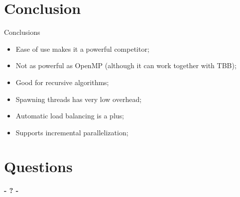 \documentclass{beamer}
\begin{document}
\section{Conclusion}
\begin{frame}[fragile]
	\begin{block}{Conclusions}
		\begin{itemize}
			\item Ease of use makes it a powerful competitor;			
			\item Not as powerful as OpenMP (although it can work together with TBB);
			\item Good for recursive algorithms;
			\item Spawning threads has very low overhead;
			\item Automatic load balancing is a plus;
			\item Supports incremental parallelization;		
		\end{itemize}		
	\end{block}
\end{frame}


\section{Questions}
\begin{frame}
\titlepage
	\begin{center}
		\Huge\bfseries
		- ? -
	\end{center}
\end{frame}
\end{document}

